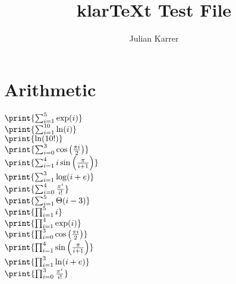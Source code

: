 \documentclass[oneside, a4paper]{article}
\author{Julian Karrer}
\title{klarTeXt Test File}
\begin{document}
\maketitle
\section*{Arithmetic}
\begin{program}

$\print{\sum_{i=1}^5 \exp(i)}$\\
$\print{\sum_{i=1}^{10} \ln(i)}$\\
$\print{\ln(10!)}$\\
$\print{\sum_{i=0}^{3}\cos\left(\frac{\pi i}{2}\right)}$\\
$\print{\sum_{i=1}^{4} i\sin\left(\frac{\pi}{i+1}\right)}$\\
$\print{\sum_{i=1}^{3} \log(i+e)}$\\
$\print{\sum_{i=0}^{4} \frac{\pi^i}{i!}}$\\
$\print{\sum_{i=1}^{5} \Theta(i-3)}$\\
$\print{\prod_{i=1}^{5} i}$\\
$\print{\prod_{i=1}^4 \exp(i)}$\\
$\print{\prod_{i=0}^{3}\cos\left(\frac{\pi i}{2}\right)}$\\
$\print{\prod_{i=1}^{4} \sin\left(\frac{\pi}{i+1}\right)}$\\
$\print{\prod_{i=1}^{3} \ln(i+e)}$\\
$\print{\prod_{i=0}^{3} \frac{\pi^i}{i!}}$\\





\end{program}
\end{document}
